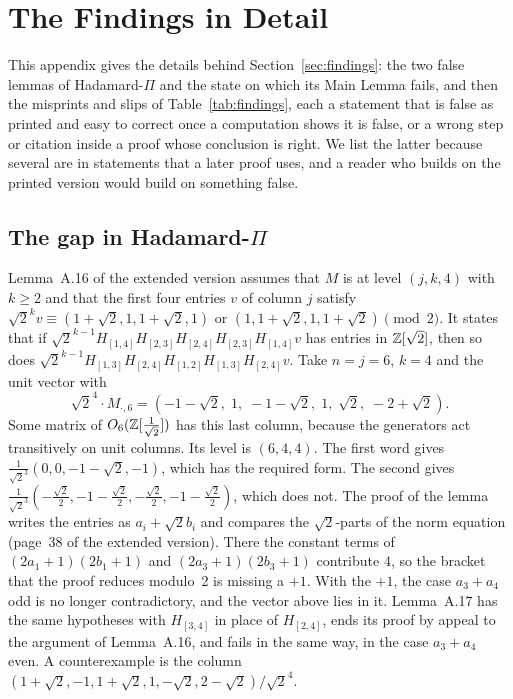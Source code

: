 \section{The Findings in Detail}\label{sec:appendix-errata}

This appendix gives the details behind Section~\ref{sec:findings}:
the two false lemmas of Hadamard-$\Pi$ and the state on which its
Main Lemma fails, and then the misprints and slips of
Table~\ref{tab:findings}, each a statement that is false as printed
and easy to correct once a computation shows it is false, or a wrong
step or citation inside a proof whose conclusion is right. We list the
latter because several are in statements that a later proof uses, and a
reader who builds on the printed version would build on something
false.

\subsection{The gap in Hadamard-\texorpdfstring{$\Pi$}{Pi}}\label{sec:gap-details}

Lemma~A.16 of the extended version assumes that $M$ is at level
$(j,k,4)$ with $k\ge2$ and that the first four entries $v$ of column
$j$ satisfy $\sqrt2^k v \equiv (1+\sqrt2,1,1+\sqrt2,1)$ or
$(1,1+\sqrt2,1,1+\sqrt2) \pmod 2$. It states that if
$\sqrt2^{k-1}H_{[1,4]}H_{[2,3]}H_{[2,4]}H_{[2,3]}H_{[1,4]}v$ has
entries in $\mathbb{Z}[\sqrt2]$, then so does
$\sqrt2^{k-1}H_{[1,3]}H_{[2,4]}H_{[1,2]}H_{[1,3]}H_{[2,4]}v$. Take
$n=j=6$, $k=4$ and the unit vector with
\[
\sqrt2^4\cdot M_{\cdot,6} = (-1-\sqrt2,\; 1,\; -1-\sqrt2,\; 1,\; \sqrt2,\; -2+\sqrt2).
\]
Some matrix of $O_6(\mathbb{Z}[\frac1{\sqrt2}])$ has this last column, because
the generators act transitively on unit columns. Its level is
$(6,4,4)$. The first word gives $\frac1{\sqrt2^{3}}(0,0,-1-\sqrt2,-1)$,
which has the required form. The second gives
$\frac1{\sqrt2^{3}}(-\frac{\sqrt2}2,-1-\frac{\sqrt2}2,-\frac{\sqrt2}2,-1-\frac{\sqrt2}2)$,
which does not. The proof of the lemma writes the entries as
$a_i+\sqrt2 b_i$ and compares the $\sqrt2$-parts of the norm equation
(page~38 of the extended version). There the constant terms of
$(2a_1+1)(2b_1+1)$ and $(2a_3+1)(2b_3+1)$ contribute $4$, so the
bracket that the proof reduces modulo~2 is missing a $+1$. With the
$+1$, the case $a_3+a_4$ odd is no longer contradictory, and the
vector above lies in it. Lemma~A.17 has the same hypotheses with
$H_{[3,4]}$ in place of $H_{[2,4]}$, ends its proof by appeal to the
argument of Lemma~A.16, and fails in the same way, in the case
$a_3+a_4$ even. A counterexample is the column
$(1+\sqrt2,-1,1+\sqrt2,1,-\sqrt2,2-\sqrt2)/\sqrt2^4$.

